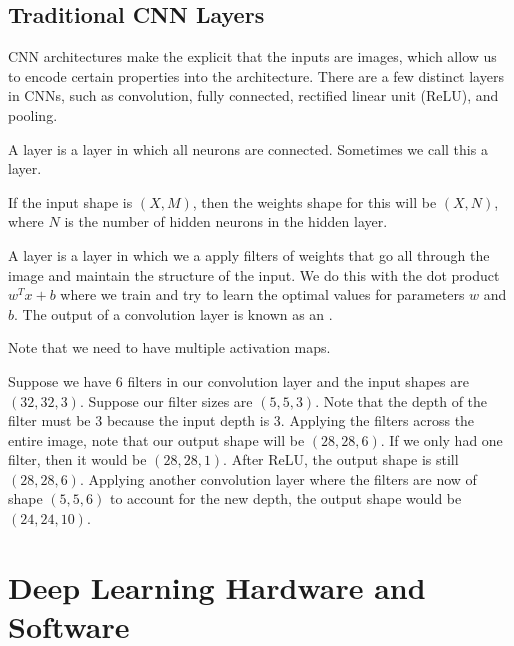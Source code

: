 \documentclass[12pt]{scrartcl}
\begin{document}
\subsection{Traditional CNN Layers}

CNN architectures make the explicit that the inputs are images, 
which allow us to encode certain properties into the architecture. 
There are a few distinct layers in CNNs, such as convolution, fully connected,
rectified linear unit (ReLU), and pooling.

\begin{definition}
  A  layer is a layer in which all neurons are connected.
Sometimes we call this a  layer.
\end{definition}

If the input shape is $(X, M)$, then the weights shape for this will be $(X, N)$, 
where $N$ is the number of hidden neurons in the hidden layer.

\begin{definition}
  A  layer is a layer in which we a apply filters of weights
  that go all through the image and maintain the structure of the input. We 
  do this with the dot product $w^Tx + b$ where we train and try to learn the 
  optimal values for parameters $w$ and $b$. The output of a convolution layer
  is known as an .
\end{definition}

\begin{note}
  Note that we need to have multiple activation maps.
\end{note}

\begin{example}
  Suppose we have 6 filters in our convolution layer and the input shapes are 
  $(32, 32, 3)$. Suppose our filter sizes are $(5, 5, 3)$. Note that the depth of 
  the filter must be 3 because the input depth is 3.
  Applying the filters across the entire image, note that our output shape will 
  be $(28, 28, 6)$. If we only had one filter, then it would be $(28, 28, 1)$.
  After ReLU, the output shape is still $(28, 28, 6)$.
  Applying another convolution layer where the filters are now of shape 
  $(5, 5, 6)$ to account for the new depth, the output shape would be 
  $(24, 24, 10)$.
\end{example}


\section{Deep Learning Hardware and Software}
\end{document}
